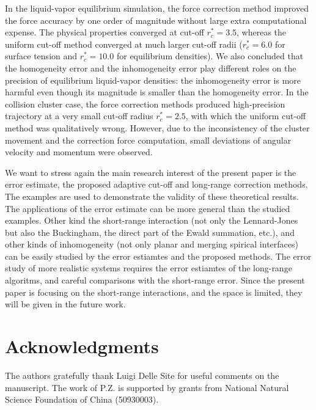 \documentclass[preprint]{revtex4}
\newcommand{\recheck}[1]{{\color{red} #1}}
\begin{document}
In the liquid-vapor equilibrium simulation, the
force correction method improved the force accuracy by one order of
magnitude without large extra computational expense. The physical
properties converged at cut-off $r_c^\ast = 3.5$, whereas the uniform
cut-off method converged at much larger cut-off radii ($r_c^\ast = 6.0$
for surface tension and $r_c^\ast = 10.0$ for equilibrium
densities). {
We also concluded that the homogeneity
error and the inhomogeneity error play different roles on the precision
of equilibrium liquid-vapor densities: the inhomogeneity error
is more harmful even though its magnitude is smaller than the homogeneity
error.}
In the collision cluster case,
the force correction methods produced high-precision trajectory at a
very small cut-off radius $r_c^\ast=2.5$, with which the uniform
cut-off method was qualitatively wrong. However, due to the
inconsistency of the cluster movement and the correction force
computation, small deviations of angular velocity and momentum were
observed.

\recheck{
  We want to stress again the main research interest of the present paper is the
  error estimate, the proposed adaptive cut-off and long-range
  correction methods. The examples are used to demonstrate
  the validity of these theoretical results. The applications
  of the error estimate can be more general than the studied examples.
  Other kind the short-range interaction (not only the Lennard-Jones
  but also the Buckingham,
  the direct part of the Ewald summation, etc.),
  and other kinds of inhomogeneity
  (not only  planar and merging spirical interfaces)
  can be easily studied by the error estiamtes and the proposed methods.
  The error study of
  more realistic systems requires the error estiamtes of the long-range
  algoritms, and careful comparisons with the short-range error.
  Since the present paper is focusing on the short-range
  interactions, and the space is limited,
  they will be given in the future work.
}


\section*{Acknowledgments}
The authors gratefully thank Luigi Delle Site for useful comments
on the manuscript. The work of P.Z. is supported by grants from
National Natural Science Foundation of China (50930003).



{}

\end{document}
